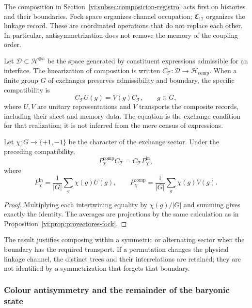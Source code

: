 The composition in Section~\ref{vi:subsec:composicion-registro}
acts first on histories and their boundaries. Fock space organizes
channel occupation; \(\mathfrak C_{12}\) organizes the linkage
record. These are coordinated operations that do not replace each
other. In particular, antisymmetrization does not remove the
memory of the coupling order.

Let \(\mathcal D\subset\mathcal H^{\otimes n}\) be the space
generated by constituent expressions admissible for an interface.
The linearization of composition is written
\(C_{\mathcal T}:\mathcal D\to\mathcal H_{\mathrm{comp}}\).
When a finite group \(G\) of exchanges preserves admissibility
and boundary, the specific compatibility is
\[
 C_{\mathcal T}U(g)=V(g)C_{\mathcal T},\qquad g\in G,
\]
where \(U,V\) are unitary representations and \(V\) transports
the composite records, including their sheet and memory data.
The equation is the exchange condition for that realization;
it is not inferred from the mere census of expressions.

\begin{proposition}
\label{vi:prop:composicion-estadistica}
Let \(\chi:G\to\{+1,-1\}\) be the character of the exchange
sector. Under the preceding compatibility,
\[
 P_\chi^{\mathrm{comp}}C_{\mathcal T}
 =C_{\mathcal T}P_\chi^{\mathrm{in}},
\]
where
\[
 P_\chi^{\mathrm{in}}=\frac1{|G|}\sum_g\chi(g)U(g),
 \qquad
 P_\chi^{\mathrm{comp}}=\frac1{|G|}\sum_g\chi(g)V(g).
\]
\end{proposition}
\begin{proof}
Multiplying each intertwining equality by
\(\chi(g)/|G|\) and summing gives exactly the identity.
The averages are projections by the same calculation as in
Proposition~\ref{vi:prop:proyectores-fock}.
\end{proof}

The result justifies composing within a symmetric or alternating
sector when the boundary has the required transport.
If a permutation changes the physical linkage channel, the distinct
trees and their interrelations are retained; they are not identified
by a symmetrization that forgets that boundary.

\subsubsection{Colour antisymmetry and the remainder of the baryonic state}

